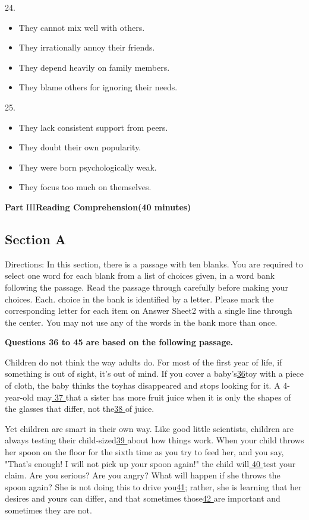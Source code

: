 \documentclass[UTF8,11pt]{ctexart}
\begin{document}
24.


\begin{itemize}[leftmargin=2em,itemsep=.2em,topsep=.4em]\item[A.] They cannot mix well with others.
\item[B.] They irrationally annoy their friends.
\item[C.] They depend heavily on family members.
\item[D.] They blame others for ignoring their needs.
\end{itemize}

25.


\begin{itemize}[leftmargin=2em,itemsep=.2em,topsep=.4em]\item[A.] They lack consistent support from peers.
\item[B.] They doubt their own popularity.
\item[C.] They were born psychologically weak.
\item[D.] They focus too much on themselves.
\end{itemize}

\textbf{Part} III\textbf{Reading Comprehension(40 minutes)}


\subsection*{Section A}


Directions: In this section, there is a passage with ten blanks. You are required to select one word for each blank from a list of choices given, in a word bank following the passage. Read the passage through carefully before making your choices. Each. choice in the bank is identified by a letter. Please mark the corresponding letter for each item on Answer Sheet2 with a single line through the center. You may not use any of the words in the bank more than once.


\textbf{Questions 36 to 45 are based on the following passage.}


Children do not think the way adults do. For most of the first year of life, if something is out of sight, it's out of mind. If you cover a baby's\uline{36}toy with a piece of cloth, the baby thinks the toyhas disappeared and stops looking for it. A 4-year-old may\uline{ 37 }that a sister has more fruit juice when it is only the shapes of the glasses that differ, not the\uline{38 }of juice.


Yet children are smart in their own way. Like good little scientists, children are always testing their child-sized\uline{39 }about how things work. When your child throws her spoon on the floor for the sixth time as you try to feed her, and you say, "That's enough! I will not pick up your spoon again!" the child will\uline{ 40 }test your claim. Are you serious? Are you angry? What will happen if she throws the spoon again? She is not doing this to drive you\uline{41}; rather, she is learning that her desires and yours can differ, and that sometimes those\uline{42 }are important and sometimes they are not.
\end{document}
